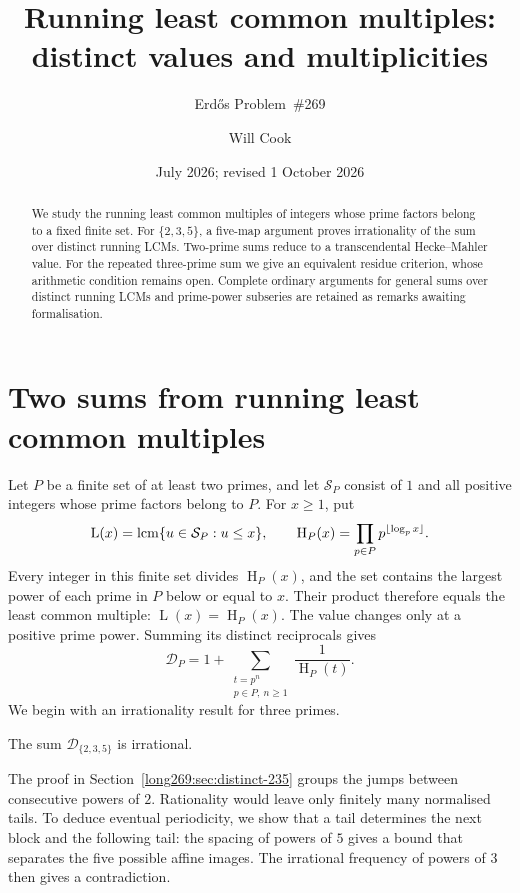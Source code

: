 \documentclass[11pt]{article}
\title{Running least common multiples:\\distinct values and multiplicities}
\subtitle{Erd\H{o}s Problem~\#269}
\author{Will Cook}
\date{July 2026; revised 1 October 2026}
\theoremstyle{remark}
\theoremstyle{plain}
\newcommand{\hgt}{\operatorname{H}}
\newcommand{\Lprefix}{\operatorname{L}}
\begin{document}
\maketitle
\noteprovenance

\begin{abstract}
We study the running least common multiples of integers whose prime
factors belong to a fixed finite set.
For $\{2,3,5\}$, a five-map argument proves irrationality of the sum over
distinct running LCMs. Two-prime sums reduce to a transcendental Hecke--Mahler
value. For the repeated three-prime sum we give an equivalent residue
criterion, whose arithmetic condition remains open. Complete ordinary
arguments for general sums over distinct running LCMs and prime-power subseries are
retained as remarks awaiting formalisation.
\end{abstract}

\section{Two sums from running least common multiples}\label{long269:sec:problem}
Let $P$ be a finite set of at least two primes, and let $\mathcal S_P$
consist of $1$ and all positive integers whose prime factors belong to
$P$. For $x\ge1$, put
\[
 \Lprefix(x)=\lcm\{u\in\mathcal S_P:u\le x\},\qquad
 \hgt_P(x)=\prod_{p\in P}p^{\lfloor\log_p x\rfloor}.
\]
Every integer in this finite set divides $\hgt_P(x)$, and the set
contains the largest power of each prime in $P$ below or equal to $x$.
Their product therefore equals the least common multiple:
$\Lprefix(x)=\hgt_P(x)$. The value changes only at a positive prime
power. Summing its distinct reciprocals gives
\[
 \mathcal D_P=1+\sum_{\substack{t=p^n\\p\in P,\ n\ge1}}\frac1{\hgt_P(t)}.
\]
We begin with an irrationality result for three primes.

\begin{theorem}\label{long269:res:distinct-height-235}
The sum $\mathcal D_{\{2,3,5\}}$ is irrational.
\end{theorem}

The proof in Section~\ref{long269:sec:distinct-235} groups the jumps
between consecutive powers of $2$. Rationality would leave only finitely
many normalised tails. To deduce eventual periodicity, we show that a
tail determines the next block and the following tail: the spacing of
powers of $5$ gives a bound that separates the five possible affine
images. The irrational frequency of powers of $3$ then gives a
contradiction.
\end{document}
